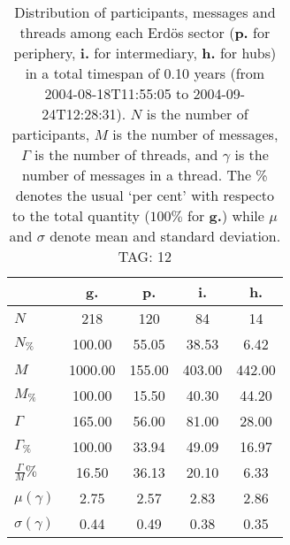 \begin{table}[h!]
\begin{center}
\begin{tabular}{| l | c | c | c | c |}\hline
 & g. & p. & i. & h. \\\hline
$N$ & 218  & 120  & 84  & 14 \\\hline
$N_{\%}$ & 100.00  & 55.05  & 38.53  & 6.42 \\\hline
$M$ & 1000.00  & 155.00  & 403.00  & 442.00 \\\hline
$M_{\%}$ & 100.00  & 15.50  & 40.30  & 44.20 \\\hline
$\Gamma$ & 165.00  & 56.00  & 81.00  & 28.00 \\\hline
$\Gamma_{\%}$ & 100.00  & 33.94  & 49.09  & 16.97 \\\hline
$\frac{\Gamma}{M}\%$ & 16.50  & 36.13  & 20.10  & 6.33 \\\hline
$\mu(\gamma)$ & 2.75  & 2.57  & 2.83  & 2.86 \\\hline
$\sigma(\gamma)$ & 0.44  & 0.49  & 0.38  & 0.35 \\\hline
\end{tabular}
\caption{Distribution of participants, messages and threads among each Erd\"os sector ({\bf p.} for periphery, {\bf i.} for intermediary, 
    {\bf h.} for hubs) in a total timespan of 0.10 years (from 2004-08-18T11:55:05 to 2004-09-24T12:28:31). $N$ is the number of participants, $M$ is the number of messages, $\Gamma$ is the number of threads, and $\gamma$ is the number of messages in a thread.
    The \% denotes the usual `per cent' with respecto to the total quantity ($100\%$ for {\bf g.})
    while $\mu$ and $\sigma$ denote mean and standard deviation. TAG: 12}
\end{center}
\end{table}